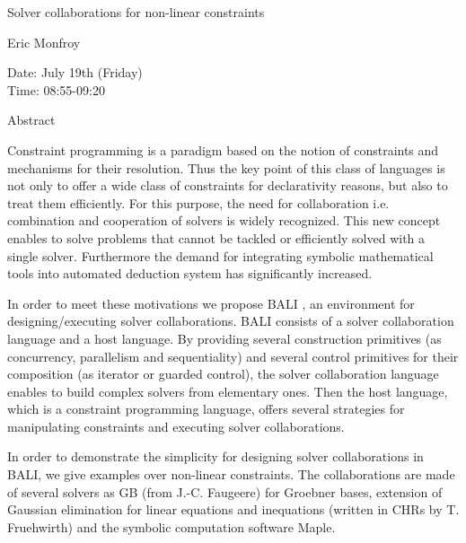 \begin{center}
\LARGE
Solver collaborations for non-linear constraints
\end{center}

\begin{center}
\Large
Eric Monfroy

\end{center}

\noindent
Date:  July 19th (Friday)\\
Time:  08:55-09:20\\

\begin{center}
\large
Abstract
\end{center}

Constraint programming is a paradigm based on the notion of constraints and mechanisms for their
resolution. Thus the key point of this class of languages is not only to offer a wide class of
constraints for declarativity reasons, but also to treat them efficiently. For this purpose, the need
for collaboration i.e. combination and cooperation of solvers is widely recognized. This new
concept enables to solve problems that cannot be tackled or efficiently solved with a single solver.
Furthermore the demand for integrating symbolic mathematical tools into automated deduction
system has significantly increased. 

In order to meet these motivations we propose BALI , an environment for designing/executing
solver collaborations. BALI consists of a solver collaboration language and a host language. By
providing several construction primitives (as concurrency, parallelism and sequentiality) and
several control primitives for their composition (as iterator or guarded control), the solver
collaboration language enables to build complex solvers from elementary ones. Then the host
language, which is a constraint programming language, offers several strategies for manipulating
constraints and executing solver collaborations. 

In order to demonstrate the simplicity for designing solver collaborations in BALI, we give
examples over non-linear constraints. The collaborations are made of several solvers as GB (from
J.-C. Faugeere) for Groebner bases, extension of Gaussian elimination for linear equations and
inequations (written in CHRs by T. Fruehwirth) and the symbolic computation software Maple. 

